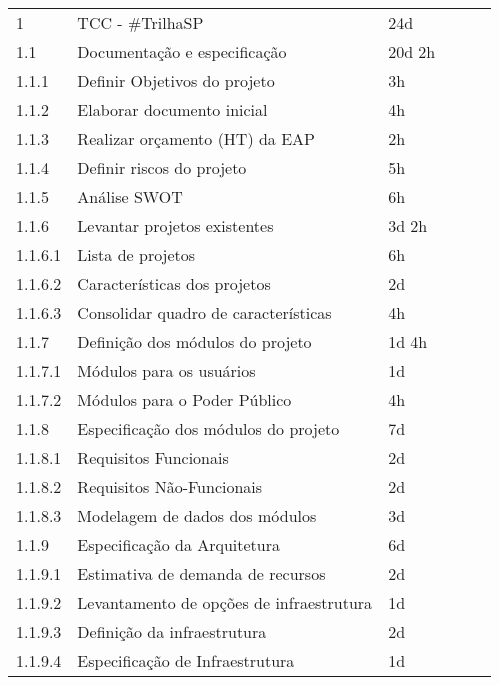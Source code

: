 \begin{table}[H]
\begin{tabular}{llllll}
      1        & TCC - \#TrilhaSP                          & 24d       \\
      1.1      & Documentação e especificação              & 20d 2h    \\
      1.1.1    & Definir Objetivos do projeto              & 3h        \\
      1.1.2    & Elaborar documento inicial                & 4h        \\
      1.1.3    & Realizar orçamento (HT) da EAP            & 2h        \\
      1.1.4    & Definir riscos do projeto                 & 5h        \\
      1.1.5    & Análise SWOT                              & 6h        \\
      1.1.6    & Levantar projetos existentes              & 3d 2h     \\
      1.1.6.1  & Lista de projetos                         & 6h        \\
      1.1.6.2  & Características dos projetos              & 2d        \\
      1.1.6.3  & Consolidar quadro de características      & 4h        \\
      1.1.7    & Definição dos módulos do projeto          & 1d 4h     \\
      1.1.7.1  & Módulos para os usuários                  & 1d        \\
      1.1.7.2  & Módulos para o Poder Público              & 4h        \\
      1.1.8    & Especificação dos módulos do projeto      & 7d        \\
      1.1.8.1  & Requisitos Funcionais                     & 2d        \\
      1.1.8.2  & Requisitos Não-Funcionais                 & 2d        \\
      1.1.8.3  & Modelagem de dados dos módulos            & 3d        \\
      1.1.9    & Especificação da Arquitetura              & 6d        \\
      1.1.9.1  & Estimativa de demanda de recursos         & 2d        \\
      1.1.9.2  & Levantamento de opções de infraestrutura  & 1d        \\
      1.1.9.3  & Definição da infraestrutura               & 2d        \\
      1.1.9.4  & Especificação de Infraestrutura           & 1d        \\

\end{tabular}
\end{table}
